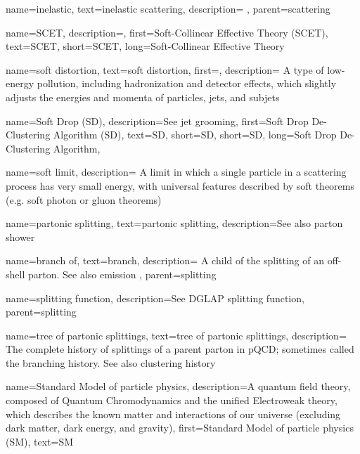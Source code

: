{
    name=inelastic,
    text=inelastic scattering,
    description={
    },
    parent=scattering
}

{
    name=SCET,
    description={},
    first={Soft-Collinear Effective Theory (SCET)},
    text={SCET},
    short={SCET},
    long={Soft-Collinear Effective Theory}
}

{
  name=soft distortion,
  text=soft distortion,
  first=,
  description={
        A type of low-energy pollution, including hadronization and detector effects, which slightly adjusts the energies and momenta of particles, jets, and subjets
  }
}

{
    name=Soft Drop (SD),
    description={See jet grooming},
    first={Soft Drop De-Clustering Algorithm (SD)},
    text={SD},
    short={SD},
    short={SD},
    long={Soft Drop De-Clustering Algorithm},
}


{
    name=soft limit,
    description={
        A limit in which a single particle in a scattering process has very small energy, with universal features described by soft theorems (e.g. soft photon or gluon theorems)
    }
}

{
  name=partonic splitting,
  text=partonic splitting,
  description={See also parton shower}
}

    {
      name=branch of,
      text=branch,
      description={
          A child of the splitting of an off-shell parton.
          See also emission
      },
      parent=splitting
    }


    {
      name=splitting function,
      description={See DGLAP splitting function},
      parent=splitting
    }

    {
      name=tree of partonic splittings,
      text=tree of partonic splittings,
      description={
          The complete history of splittings of a parent parton in pQCD;
          sometimes called the branching history.
          See also clustering history
      }
    }





{
  name=Standard Model of particle physics,
  description={A quantum field theory, composed of Quantum Chromodynamics and the unified Electroweak theory, which describes the known matter and interactions of our universe (excluding dark matter, dark energy, and gravity)},
  first=Standard Model of particle physics (SM),
  text=SM
}

